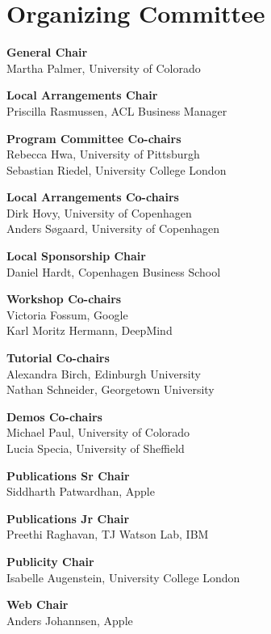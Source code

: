 \markboth{}{} %
\markright{}{} %

\section{Organizing Committee}{}


\setlength{\parindent}{0pt}

{\bf General Chair} \\
Martha Palmer, University of Colorado

{\bf Local Arrangements Chair} \\
Priscilla Rasmussen, ACL Business Manager

{\bf Program Committee Co-chairs} \\
Rebecca Hwa, University of Pittsburgh \\
Sebastian Riedel, University College London

{\bf Local Arrangements Co-chairs} \\
Dirk Hovy, University of Copenhagen \\
Anders S{\o}gaard, University of Copenhagen

{\bf Local Sponsorship Chair} \\
Daniel Hardt, Copenhagen Business School

{\bf Workshop Co-chairs} \\
Victoria Fossum, Google\\
Karl Moritz Hermann, DeepMind

{\bf Tutorial Co-chairs} \\
Alexandra Birch, Edinburgh University \\
Nathan Schneider, Georgetown University

{\bf Demos Co-chairs} \\
Michael Paul, University of Colorado \\
Lucia Specia, University of Sheffield

{\bf Publications Sr Chair} \\
Siddharth Patwardhan, Apple

{\bf Publications Jr Chair} \\
Preethi Raghavan, TJ Watson Lab, IBM

{\bf Publicity Chair}\\
Isabelle Augenstein, University College London

{\bf Web Chair}\\
Anders Johannsen, Apple

